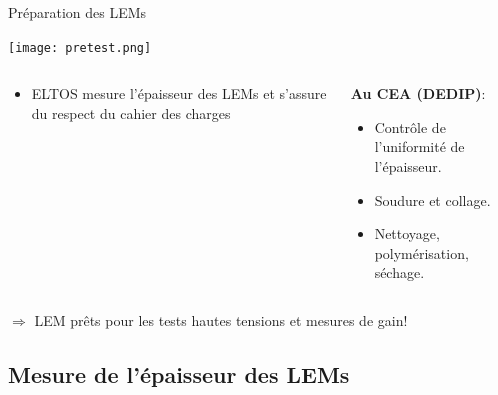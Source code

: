     \begin{frame}{Préparation des LEMs}
    	\begin{scriptsize}
    		\begin{center}
		    	\texttt{[image: pretest.png]}
	    	\end{center}
	    	\begin{columns}
	    		\begin{column}{0.5\textwidth}
	    			\begin{itemize}
	    				\item ELTOS mesure l'épaisseur des LEMs et s'assure du respect du cahier des charges
	    			\end{itemize}
	    		\end{column}\hfill
	    		\begin{column}{0.5\textwidth}
	    			\textbf{\hspace{0.3cm}Au CEA (DEDIP)}:
	    			\begin{itemize}
	    				\item Contrôle de l'uniformité de l'épaisseur.
	    				\item Soudure et collage.
	    				\item Nettoyage, polymérisation, séchage.
	    			\end{itemize}
	    		\end{column}
	    	\end{columns}
	    \end{scriptsize}
	    \vspace{0.5cm}
        $\Rightarrow$ LEM prêts pour les tests hautes tensions et mesures de gain!
    \end{frame}

    \subsection[Épaisseur]{Mesure de l'épaisseur des LEMs}

